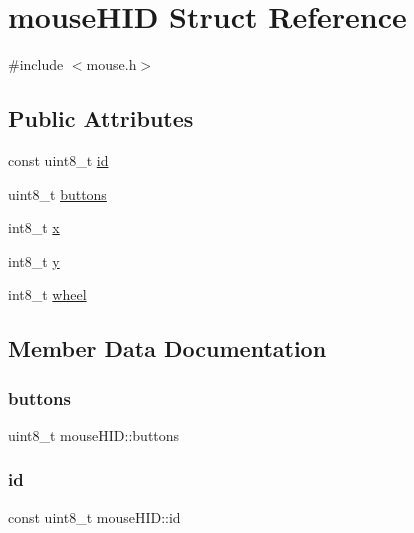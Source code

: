 \hypertarget{structmouseHID}{}\section{mouse\+H\+ID Struct Reference}
\label{structmouseHID}


{\ttfamily \#include $<$mouse.\+h$>$}

\subsection*{Public Attributes}
\begin{DoxyCompactItemize}
\item 
const uint8\+\_\+t \hyperlink{structmouseHID_af258f9091999390e7d6c362d90eedd4d}{id}
\item 
uint8\+\_\+t \hyperlink{structmouseHID_a17ca2a0a92bfd4d0ca5c6e063361d4f8}{buttons}
\item 
int8\+\_\+t \hyperlink{structmouseHID_a0affa731298f3abbf6feebfd00387baf}{x}
\item 
int8\+\_\+t \hyperlink{structmouseHID_a184a9842c9e0aaecfb832459428d860d}{y}
\item 
int8\+\_\+t \hyperlink{structmouseHID_a1317617ea3f7c9d0231e852d0e15d2d2}{wheel}
\end{DoxyCompactItemize}


\subsection{Member Data Documentation}
\mbox{\label{structmouseHID_a17ca2a0a92bfd4d0ca5c6e063361d4f8}} 
\subsubsection{\texorpdfstring{buttons}{buttons}}
{\footnotesize\ttfamily uint8\+\_\+t mouse\+H\+I\+D\+::buttons}

\mbox{\label{structmouseHID_af258f9091999390e7d6c362d90eedd4d}} 
\subsubsection{\texorpdfstring{id}{id}}
{\footnotesize\ttfamily const uint8\+\_\+t mouse\+H\+I\+D\+::id}

